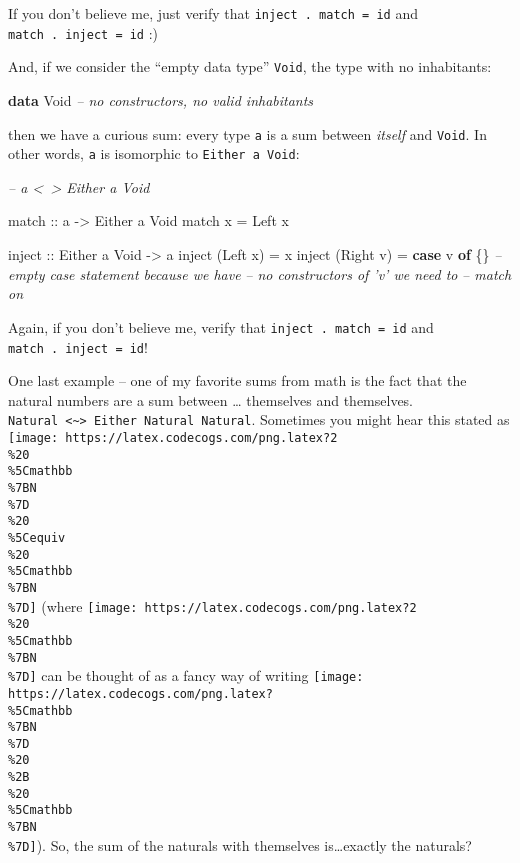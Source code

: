 \documentclass[]{article}
\newenvironment{Shaded}{}{}
\newcommand{\CommentTok}[1]{\textcolor[rgb]{0.38,0.63,0.69}{\textit{#1}}}
\newcommand{\DataTypeTok}[1]{\textcolor[rgb]{0.56,0.13,0.00}{#1}}
\newcommand{\FunctionTok}[1]{\textcolor[rgb]{0.02,0.16,0.49}{#1}}
\newcommand{\KeywordTok}[1]{\textcolor[rgb]{0.00,0.44,0.13}{\textbf{#1}}}
\newcommand{\NormalTok}[1]{#1}
\newcommand{\OtherTok}[1]{\textcolor[rgb]{0.00,0.44,0.13}{#1}}
\begin{document}
If you don't believe me, just verify that \texttt{inject\ .\ match\ =\ id} and
\texttt{match\ .\ inject\ =\ id} :)

And, if we consider the ``empty data type'' \texttt{Void}, the type with no
inhabitants:

\begin{Shaded}
\begin{Highlighting}[]
\KeywordTok{data} \DataTypeTok{Void}           \CommentTok{-- no constructors, no valid inhabitants}
\end{Highlighting}
\end{Shaded}

then we have a curious sum: every type \texttt{a} is a sum between \emph{itself}
and \texttt{Void}. In other words, \texttt{a} is isomorphic to
\texttt{Either\ a\ Void}:

\begin{Shaded}
\begin{Highlighting}[]
\CommentTok{-- a <~> Either a Void}

\OtherTok{match ::}\NormalTok{ a }\OtherTok{->} \DataTypeTok{Either}\NormalTok{ a }\DataTypeTok{Void}
\NormalTok{match x }\FunctionTok{=} \DataTypeTok{Left}\NormalTok{ x}

\OtherTok{inject ::} \DataTypeTok{Either}\NormalTok{ a }\DataTypeTok{Void} \OtherTok{->}\NormalTok{ a}
\NormalTok{inject (}\DataTypeTok{Left}\NormalTok{  x) }\FunctionTok{=}\NormalTok{ x}
\NormalTok{inject (}\DataTypeTok{Right}\NormalTok{ v) }\FunctionTok{=} \KeywordTok{case}\NormalTok{ v }\KeywordTok{of}
\NormalTok{                    \{\}  }\CommentTok{-- empty case statement because we have}
                        \CommentTok{-- no constructors of 'v' we need to}
                        \CommentTok{-- match on}
\end{Highlighting}
\end{Shaded}

Again, if you don't believe me, verify that \texttt{inject\ .\ match\ =\ id} and
\texttt{match\ .\ inject\ =\ id}!

One last example -- one of my favorite sums from math is the fact that the
natural numbers are a sum between \ldots{} themselves and themselves.
\texttt{Natural\ \textless{}\textasciitilde{}\textgreater{}\ Either\ Natural\ Natural}.
Sometimes you might hear this stated as
\texttt{[image: https://latex.codecogs.com/png.latex?2\\\%20\\\%5Cmathbb\\\%7BN\\\%7D\\\%20\\\%5Cequiv\\\%20\\\%5Cmathbb\\\%7BN\\\%7D]}
(where
\texttt{[image: https://latex.codecogs.com/png.latex?2\\\%20\\\%5Cmathbb\\\%7BN\\\%7D]}
can be thought of as a fancy way of writing
\texttt{[image: https://latex.codecogs.com/png.latex?\\\%5Cmathbb\\\%7BN\\\%7D\\\%20\\\%2B\\\%20\\\%5Cmathbb\\\%7BN\\\%7D]}).
So, the sum of the naturals with themselves is\ldots{}exactly the naturals?
\end{document}
